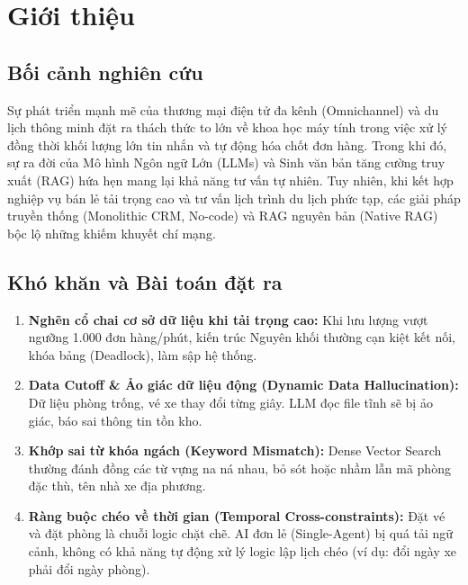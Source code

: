 \section{Giới thiệu}

\subsection{Bối cảnh nghiên cứu}
Sự phát triển mạnh mẽ của thương mại điện tử đa kênh (Omnichannel) và du lịch thông minh đặt ra thách thức to lớn về khoa học máy tính trong việc xử lý đồng thời khối lượng lớn tin nhắn và tự động hóa chốt đơn hàng. Trong khi đó, sự ra đời của Mô hình Ngôn ngữ Lớn (LLMs) và Sinh văn bản tăng cường truy xuất (RAG) hứa hẹn mang lại khả năng tư vấn tự nhiên. Tuy nhiên, khi kết hợp nghiệp vụ bán lẻ tải trọng cao và tư vấn lịch trình du lịch phức tạp, các giải pháp truyền thống (Monolithic CRM, No-code) và RAG nguyên bản (Native RAG) bộc lộ những khiếm khuyết chí mạng.

\subsection{Khó khăn và Bài toán đặt ra}
\begin{enumerate}
    \item \textbf{Nghẽn cổ chai cơ sở dữ liệu khi tải trọng cao:} Khi lưu lượng vượt ngưỡng 1.000 đơn hàng/phút, kiến trúc Nguyên khối thường cạn kiệt kết nối, khóa bảng (Deadlock), làm sập hệ thống.
    \item \textbf{Data Cutoff \& Ảo giác dữ liệu động (Dynamic Data Hallucination):} Dữ liệu phòng trống, vé xe thay đổi từng giây. LLM đọc file tĩnh sẽ bị ảo giác, báo sai thông tin tồn kho.
    \item \textbf{Khớp sai từ khóa ngách (Keyword Mismatch):} Dense Vector Search thường đánh đồng các từ vựng na ná nhau, bỏ sót hoặc nhầm lẫn mã phòng đặc thù, tên nhà xe địa phương.
    \item \textbf{Ràng buộc chéo về thời gian (Temporal Cross-constraints):} Đặt vé và đặt phòng là chuỗi logic chặt chẽ. AI đơn lẻ (Single-Agent) bị quá tải ngữ cảnh, không có khả năng tự động xử lý logic lập lịch chéo (ví dụ: đổi ngày xe phải đổi ngày phòng).
\end{enumerate}

